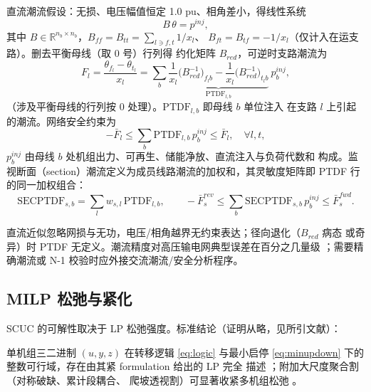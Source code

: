 直流潮流假设：无损、电压幅值恒定 1.0 pu、相角差小，得线性系统
\begin{equation}
B\,\theta = p^{inj},
\end{equation}
其中 $B\in\mathbb R^{n_b\times n_b}$，$B_{ff}=B_{tt}=\sum_{l\ni f,t} 1/x_l$、
$B_{ft}=B_{tf}=-1/x_l$（仅计入在运支路）。删去平衡母线（取 0 号）行列得
约化矩阵 $B_{red}$，可逆时支路潮流为
\begin{equation}
F_l=\frac{\theta_{f_l}-\theta_{t_l}}{x_l}
=\sum_{b}\underbrace{\frac{1}{x_l}\big(B^{-1}_{red}\big)_{f_l b}
-\frac{1}{x_l}\big(B^{-1}_{red}\big)_{t_l b}}_{\displaystyle \mathrm{PTDF}_{l,b}}
\ p^{inj}_b ,
\label{eq:ptdf}
\end{equation}
（涉及平衡母线的行列按 0 处理）。$\mathrm{PTDF}_{l,b}$ 即母线 $b$ 单位注入
在支路 $l$ 上引起的潮流。网络安全约束为
\begin{equation}
-\bar F_l\le \sum_b \mathrm{PTDF}_{l,b}\, p^{inj}_b \le \bar F_l,\quad\forall l,t,
\label{eq:linelim}
\end{equation}
$p^{inj}_b$ 由母线 $b$ 处机组出力、可再生、储能净放、直流注入与负荷代数和
构成。监视断面（section）潮流定义为成员线路潮流的加权和，其灵敏度矩阵即
PTDF 行的同一加权组合：
\begin{equation}
\mathrm{SECPTDF}_{s,b}=\sum_{l} w_{s,l}\,\mathrm{PTDF}_{l,b},\qquad
-\bar F^{rev}_s\le \sum_b \mathrm{SECPTDF}_{s,b}\,p^{inj}_b\le \bar F^{fwd}_s.
\label{eq:section}
\end{equation}

\begin{remark}[误差与适用条件]
直流近似忽略网损与无功，电压/相角越界无约束表达；径向退化（$B_{red}$ 病态
或奇异）时 PTDF 无定义。潮流精度对高压输电网典型误差在百分之几量级
\cite{stott2009}；需要精确潮流或 N-1 校验时应外接交流潮流/安全分析程序。
\end{remark}

\subsection{MILP 松弛与紧化}
\label{sec:tightening}

SCUC 的可解性取决于 LP 松弛强度。标准结论（证明从略，见所引文献）：

\begin{proposition}[启停转移的凸包]
单机组三二进制 $(u,y,z)$ 在转移逻辑 \eqref{eq:logic} 与最小启停
\eqref{eq:minupdown} 下的整数可行域，存在由其紧 formulation 给出的 LP 完全
描述 \cite{rajan2005,morales2013}；附加大尺度聚合割（对称破缺、累计段耦合、
爬坡透视割）可显著收紧多机组松弛 \cite{ostrowski2012}。
\end{proposition}

